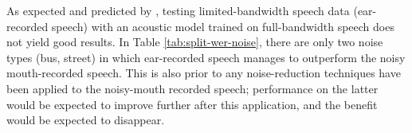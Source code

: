 % 
% 

As expected and predicted by \cite{morales:05}, testing limited-bandwidth speech data (ear-recorded speech) with an acoustic model trained on full-bandwidth speech does not yield good results.  In Table \ref{tab:split-wer-noise}, there are only two noise types (bus, street) in which ear-recorded speech manages to outperform the noisy mouth-recorded speech.  This is also prior to any noise-reduction techniques have been applied to the noisy-mouth recorded speech; performance on the latter would be expected to improve further after this application, and the benefit would be expected to disappear.


